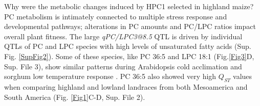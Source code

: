 \documentclass[9pt,twocolumn,twoside,lineno]{BioRxiv}
\begin{document}
Why were the metabolic changes induced by HPC1 selected in highland maize?
PC metabolism is intimately connected to multiple stress response and developmental pathways; alterations in PC amounts and PC/LPC ratios impact overall plant fitness.
The large \textit{qPC/LPC3@8.5} QTL is driven by individual QTLs of PC and LPC species with high levels of unsaturated fatty acids (Sup. Fig. \ref{SupFig2}).
Some of these species, like PC 36:5 and LPC 18:1  (Fig.\ref{Fig3}D, Sup. File 3), show similar patterns during Arabidopsis cold acclimation \cite{Welti2002-uk} and sorghum low temperature response \cite{Marla2017-ph}.
PC 36:5 also showed very high $Q_{ST}$ values when comparing highland and lowland landraces from both Mesoamerica and South America (Fig. \ref{Fig1}C-D, Sup. File 2).
\end{document}
